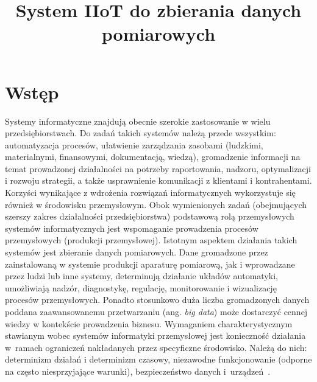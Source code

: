 \documentclass[a4paper, 12pt, twoside]{article}
\title{System IIoT do zbierania danych pomiarowych}
\date{}
\begin{document}
\clearpage\maketitle %
\thispagestyle{empty}

\listoftodos

\newpage

\tableofcontents

\newpage
\section{Wstęp}\label{intro}

Systemy informatyczne znajdują obecnie szerokie zastosowanie w wielu przedsiębiorstwach.
Do zadań takich systemów należą przede wszystkim: automatyzacja procesów,
ułatwienie zarządzania zasobami (ludzkimi, materialnymi, finansowymi, dokumentacją, wiedzą),
gromadzenie informacji na temat prowadzonej
działalności na potrzeby raportowania, nadzoru, optymalizacji i rozwoju strategii, a także
usprawnienie komunikacji z klientami i kontrahentami. Korzyści wynikające z wdrożenia
rozwiązań informatycznych wykorzystuje się również w środowisku
przemysłowym. Obok wymienionych zadań (obejmujących szerszy zakres działalności
przedsiębiorstwa) podstawową rolą przemysłowych systemów informatycznych
jest wspomaganie prowadzenia procesów przemysłowych (produkcji przemysłowej).
Istotnym aspektem działania takich systemów
jest zbieranie danych pomiarowych. Dane gromadzone przez zainstalowaną w systemie produkcji
aparaturę pomiarową, jak i wprowadzane przez ludzi lub inne systemy, determinują działanie układów automatyki,
umożliwiają nadzór, diagnostykę, regulację, monitorowanie i wizualizację procesów przemysłowych.
Ponadto stosunkowo duża liczba gromadzonych danych poddana zaawansowanemu przetwarzaniu
(ang. \emph{big data})
może dostarczyć cennej wiedzy w kontekście prowadzenia biznesu.
Wymaganiem charakterystycznym stawianym wobec systemów informatyki przemysłowej
jest konieczność działania w~ramach ograniczeń nakładanych przez specyficzne środowisko.
Należą do nich: determinizm działań i determinizm czasowy, niezawodne funkcjonowanie (odporne
na często niesprzyjające warunki), bezpieczeństwo danych i~urządzeń~\cite{isp}.
\end{document}
